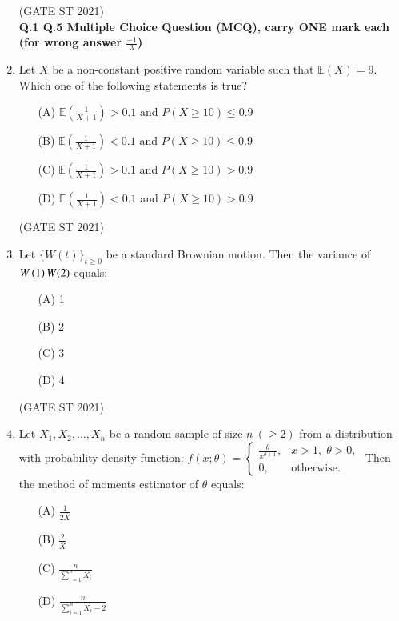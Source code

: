 \documentclass[journal,12pt,onecolumn]{IEEEtran}
\theoremstyle{remark}
\begin{document}
\begin{enumerate}
\hfill (GATE ST 2021) \\


\textbf{Q.1 \text{-} Q.5 Multiple Choice Question (MCQ), carry ONE mark each (for wrong answer $\frac{-1}{3}$)}


\item
Let $X$ be a non-constant positive random variable such that $\mathbb{E}(X) = 9$.  
Which one of the following statements is true?

\begin{enumerate}
\item[(A)] $\mathbb{E}\left( \frac{1}{X+1} \right) > 0.1$ and $P(X \geq 10) \leq 0.9$
\item[(B)] $\mathbb{E}\left( \frac{1}{X+1} \right) < 0.1$ and $P(X \geq 10) \leq 0.9$
\item[(C)] $\mathbb{E}\left( \frac{1}{X+1} \right) > 0.1$ and $P(X \geq 10) > 0.9$
\item[(D)] $\mathbb{E}\left( \frac{1}{X+1} \right) < 0.1$ and $P(X \geq 10) > 0.9$
\end{enumerate}

\hfill (GATE ST 2021) \\


\item
Let $\{W(t)\}_{t \geq 0}$ be a standard Brownian motion.  
Then the variance of $W\left(1\right) W(2)$ equals:
\begin{enumerate}
\item[(A)] 1
\item[(B)] 2
\item[(C)] 3
\item[(D)] 4
\end{enumerate}

\hfill (GATE ST 2021) \\

\item
Let $X_1, X_2, \dots, X_n$ be a random sample of size $n \ (\geq 2)$ from a distribution with probability density function:
$
f(x; \theta) =
\begin{cases}
\frac{\theta}{x^{\theta+1}}, & x > 1, \; \theta > 0, \\
0, & \text{otherwise}.
\end{cases}
$
Then the method of moments estimator of $\theta$ equals:
\begin{enumerate}
\item[(A)] $\frac{1}{2\bar{X}}$
\item[(B)] $\frac{2}{\bar{X}}$
\item[(C)] $\frac{n}{\sum_{i=1}^n X_i}$
\item[(D)] $\frac{n}{\sum_{i=1}^n X_i - 2}$
\end{enumerate}


\end{enumerate}
\end{document}

